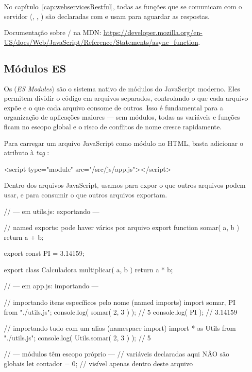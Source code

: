 No capítulo~\ref{cap:webservicesRestful}, todas as funções que se comunicam com o servidor (, , ) são declaradas com  e usam  para aguardar as respostas.

\begin{saibaMais}
    Documentação sobre / na MDN: \url{https://developer.mozilla.org/en-US/docs/Web/JavaScript/Reference/Statements/async_function}.
\end{saibaMais}


\subsection{Módulos ES}

Os  (\textit{ES Modules}) são o sistema nativo de módulos do JavaScript moderno. Eles permitem dividir o código em arquivos separados, controlando o que cada arquivo expõe e o que cada arquivo consome de outros. Isso é fundamental para a organização de aplicações maiores --- sem módulos, todas as variáveis e funções ficam no escopo global e o risco de conflitos de nome cresce rapidamente.

Para carregar um arquivo JavaScript como módulo no HTML, basta adicionar o atributo  à \textit{tag} :

\begin{boxHTMLCode}
<script type="module" src="/src/js/app.js"></script>
\end{boxHTMLCode}

Dentro dos arquivos JavaScript, usamos  para expor o que outros arquivos podem usar, e  para consumir o que outros arquivos exportam.

\begin{boxJavaScriptCode}[title=Exportando e importando com módulos ES]
// --- em utils.js: exportando ---

// named exports: pode haver vários por arquivo
export function somar( a, b ) {
    return a + b;
}

export const PI = 3.14159;

export class Calculadora {
    multiplicar( a, b ) { return a * b; }
}


// --- em app.js: importando ---

// importando itens específicos pelo nome (named imports)
import { somar, PI } from "./utils.js";
console.log( somar( 2, 3 ) ); // 5
console.log( PI );            // 3.14159

// importando tudo com um alias (namespace import)
import * as Utils from "./utils.js";
console.log( Utils.somar( 2, 3 ) ); // 5


// --- módulos têm escopo próprio ---
// variáveis declaradas aqui NÃO são globais
let contador = 0; // visível apenas dentro deste arquivo
\end{boxJavaScriptCode}

